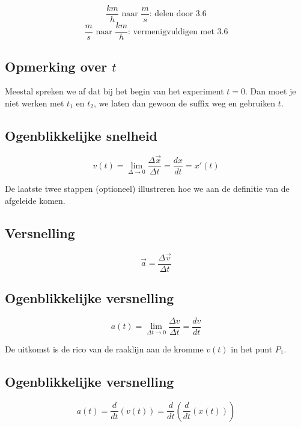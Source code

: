 \[\frac{km}{h} \textrm{ naar } \frac{m}{s} \textrm{: delen door } 3.6\]
\[\frac{m}{s} \textrm{ naar } \frac{km}{h} \textrm{: vermenigvuldigen met } 3.6\]

\subsection{Opmerking over \(t\)}

Meestal spreken we af dat bij het begin van het experiment \(t = 0\). Dan moet je niet werken met \(t_1\) en \(t_2\), we laten dan gewoon de suffix weg en gebruiken \(t\).

\subsection{Ogenblikkelijke snelheid}

\[
v(t) = \lim_{\Delta \to 0}{\frac{\Delta \vec{x}}{\Delta t}} = \frac{dx}{dt} = x'(t)
\]

De laatste twee stappen (optioneel) illustreren hoe we aan de definitie van de afgeleide komen.

\subsection{Versnelling}

\[\vec{a} = \frac{\Delta \vec{v}}{\Delta t} \]

\subsection{Ogenblikkelijke versnelling}

\[ a(t) = \lim_{\Delta t \to 0}{\frac{\Delta v}{\Delta t}} = \frac{dv}{dt} \]

De uitkomst is de rico van de raaklijn aan de kromme \(v(t)\) in het punt \(P_1\).

\subsection{Ogenblikkelijke versnelling}

\[
a(t) = \frac{d}{dt} (v(t)) = \frac{d}{dt} (\frac{d}{dt} (x(t)))
\]